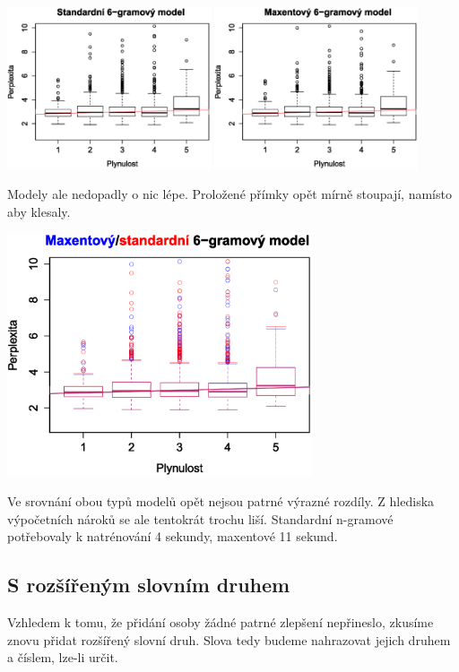 \documentclass[12pt,a4paper]{report}
\begin{document}
\begin{center}
	\includegraphics[width=60mm]{./grafy/morf/ngram/osoba+cislo.svg.eps}
	\includegraphics[width=60mm]{./grafy/morf/maxent/osoba+cislo.svg.eps}	
\end{center}
Modely ale nedopadly o nic lépe. Proložené přímky opět mírně stoupají, namísto aby klesaly.
\begin{center}
	\includegraphics[width=90mm]{./grafy/morf/porovnani/osoba+cislo.svg.eps}	
\end{center}
Ve srovnání obou typů modelů opět nejsou patrné výrazné rozdíly. Z hlediska výpočetních nároků se ale tentokrát trochu liší. Standardní n-gramové potřebovaly k natrénování 4 sekundy, maxentové 11 sekund.

\subsection{S rozšířeným slovním druhem}
Vzhledem k tomu, že přidání osoby žádné patrné zlepšení nepřineslo, zkusíme znovu přidat rozšířený slovní druh. Slova tedy budeme nahrazovat jejich druhem a číslem, lze-li určit.
\end{document}
